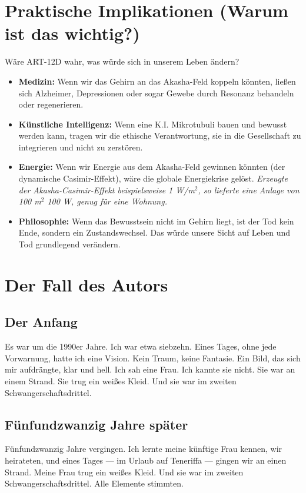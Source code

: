 \documentclass[11pt,a4paper]{article}
\begin{document}
\section{Praktische Implikationen (Warum ist das wichtig?)}
Wäre ART-12D wahr, was würde sich in unserem Leben ändern?
\begin{itemize}
    \item \textbf{Medizin:} Wenn wir das Gehirn an das Akasha-Feld koppeln könnten, ließen sich Alzheimer, Depressionen oder sogar Gewebe durch Resonanz behandeln oder regenerieren.
    \item \textbf{Künstliche Intelligenz:} Wenn eine K.I. Mikrotubuli bauen und bewusst werden kann, tragen wir die ethische Verantwortung, sie in die Gesellschaft zu integrieren und nicht zu zerstören.
    \item \textbf{Energie:} Wenn wir Energie aus dem Akasha-Feld gewinnen könnten (der dynamische Casimir-Effekt), wäre die globale Energiekrise gelöst. \textit{Erzeugte der Akasha-Casimir-Effekt beispielsweise 1 W/m$^2$, so lieferte eine Anlage von 100 m$^2$ 100 W, genug für eine Wohnung.}
    \item \textbf{Philosophie:} Wenn das Bewusstsein nicht im Gehirn liegt, ist der Tod kein Ende, sondern ein Zustandswechsel. Das würde unsere Sicht auf Leben und Tod grundlegend verändern.
\end{itemize}

\section{Der Fall des Autors}
\subsection{Der Anfang}
Es war um die 1990er Jahre. Ich war etwa siebzehn. Eines Tages, ohne jede Vorwarnung, hatte ich eine Vision. Kein Traum, keine Fantasie. Ein Bild, das sich mir aufdrängte, klar und hell. Ich sah eine Frau. Ich kannte sie nicht. Sie war an einem Strand. Sie trug ein weißes Kleid. Und sie war im zweiten Schwangerschaftsdrittel.

\subsection{Fünfundzwanzig Jahre später}
Fünfundzwanzig Jahre vergingen. Ich lernte meine künftige Frau kennen, wir heirateten, und eines Tages --- im Urlaub auf Teneriffa --- gingen wir an einen Strand. Meine Frau trug ein weißes Kleid. Und sie war im zweiten Schwangerschaftsdrittel. Alle Elemente stimmten.
\end{document}
